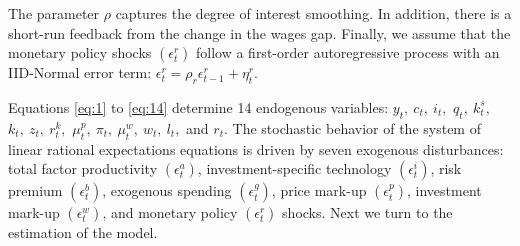 \documentclass[11pt]{article}
\newcommand{\youtput}{wages}
\newcommand{\interest}{interest}
\newcommand{\wage}{investment}
\newcommand{\price}{price}
\begin{document}
The parameter \(\rho\) captures the degree of \interest{} smoothing. In
addition, there is a short-run feedback from the change in the
\youtput{} gap. Finally, we assume that the monetary policy shocks
\((\epsilon_t^r)\) follow a first-order autoregressive process with an
IID-Normal error term:
\(\epsilon_t^r = \rho_r\epsilon_{t-1}^r + \eta_t^r\).

Equations \eqref{eq:1} to \eqref{eq:14} determine 14 endogenous
variables: \(y_t,\ c_t,\ i_t,\) \(q_t,\ k_t^s,\) \(k_t,\ z_t,\ r_t^k,\)
\(\mu_t^p,\ \pi_t,\ \mu_t^w,\ w_t,\ l_t,\) and \(r_t\). The stochastic
behavior of the system of linear rational expectations equations is
driven by seven exogenous disturbances: total factor productivity
\((\epsilon^a_t)\), investment-specific technology \((\epsilon^i_t)\),
risk premium \((\epsilon_t^b)\), exogenous spending \((\epsilon_t^g)\),
\price{} mark-up \((\epsilon_t^p)\), \wage{} mark-up \((\epsilon_t^w)\),
and monetary policy \((\epsilon_t^r)\) shocks. Next we turn to the
estimation of the model.





\end{document}
